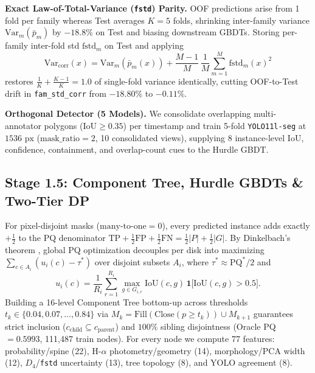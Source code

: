 \documentclass[sigconf]{acmart}
\begin{document}
\textbf{Exact Law-of-Total-Variance (\texttt{fstd}) Parity.}
OOF predictions arise from 1 fold per family whereas Test averages $K{=}5$ folds, shrinking inter-family variance $\mathrm{Var}_m(\bar{p}_m)$ by $-18.8\%$ on Test and biasing downstream GBDTs. Storing per-family inter-fold std $\mathrm{fstd}_m$ on Test and applying
\begin{equation}
\mathrm{Var}_{\text{corr}}(x) = \mathrm{Var}_m(\bar{p}_m(x)) + \frac{M-1}{M}\,\frac{1}{M}\sum_{m=1}^{M}\mathrm{fstd}_m(x)^2
\end{equation}
restores $\frac{1}{K}+\frac{K-1}{K}=1.0$ of single-fold variance identically, cutting OOF-to-Test drift in \texttt{fam\_std\_corr} from $-18.80\%$ to $-0.11\%$.

\textbf{Orthogonal Detector (5 Models).}
We consolidate overlapping multi-annotator polygons ($\mathrm{IoU}\ge 0.35$) per timestamp and train 5-fold \texttt{YOLO11l-seg} \cite{jocher2024yolo11} at $1536\text{ px}$ ($\mathrm{mask\_ratio}{=}2$, 10 consolidated views), supplying 8 instance-level IoU, confidence, containment, and overlap-count cues to the Hurdle GBDT.

\subsection{Stage 1.5: Component Tree, Hurdle GBDTs \& Two-Tier DP}
For pixel-disjoint masks ($\mathrm{many\text{-}to\text{-}one}=0$), every predicted instance adds exactly $+\frac{1}{2}$ to the PQ denominator $\mathrm{TP}+\frac{1}{2}\mathrm{FP}+\frac{1}{2}\mathrm{FN}=\frac{1}{2}|P|+\frac{1}{2}|G|$. By Dinkelbach's theorem \cite{dinkelbach1967nonlinear}, global PQ optimization decouples per disk into maximizing $\sum_{c\in A_i}(u_i(c)-\tau^*)$ over disjoint subsets $A_i$, where $\tau^*\approx \mathrm{PQ}^*/2$ and
\begin{equation}
u_i(c) = \frac{1}{R_i}\sum_{r=1}^{R_i}\max_{g\in G_{i,r}} \mathrm{IoU}(c,g)\,\mathbf{1}\bigl[\mathrm{IoU}(c,g)>0.5\bigr].
\end{equation}
Building a 16-level Component Tree bottom-up across thresholds $t_k \in \{0.04, 0.07, \dots, 0.84\}$ via $M_k=\mathrm{Fill}(\mathrm{Close}(p\ge t_k))\cup M_{k+1}$ guarantees strict inclusion ($c_{\text{child}}\subseteq c_{\text{parent}}$) and $100\%$ sibling disjointness (Oracle PQ $=0.5993$, 111,487 train nodes). For every node we compute 77 features: probability/spine (22), H-$\alpha$ photometry/geometry (14), morphology/PCA width (12), $D_4$/\texttt{fstd} uncertainty (13), tree topology (8), and YOLO agreement (8).
\end{document}
